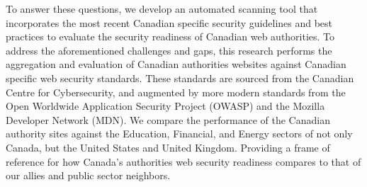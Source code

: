 \documentclass[pdflatex,sn-mathphys-num]{sn-jnl}
\numberwithin{equation}{section}
\theoremstyle{thmstyleone}
\theoremstyle{thmstyletwo}%
\theoremstyle{thmstylethree}%
\begin{document}
%
%





\vspace{1em}To answer these questions, we develop an automated scanning tool that incorporates the most 
recent Canadian specific security guidelines and best practices to evaluate the security 
readiness of Canadian web authorities. To address the aforementioned challenges and gaps, this research 
performs the aggregation and evaluation of Canadian authorities websites against Canadian specific web security 
standards. These standards are sourced from the Canadian Centre for Cybersecurity, and augmented
by more modern standards from the Open Worldwide Application Security Project (OWASP) and the 
Mozilla Developer Network (MDN). 
We compare the performance of the Canadian authority sites against the 
Education, Financial, and Energy sectors of not only Canada, but the United States and United 
Kingdom. Providing a frame of reference for how Canada's authorities web security readiness compares
to that of our allies and public sector neighbors.
\end{document}
